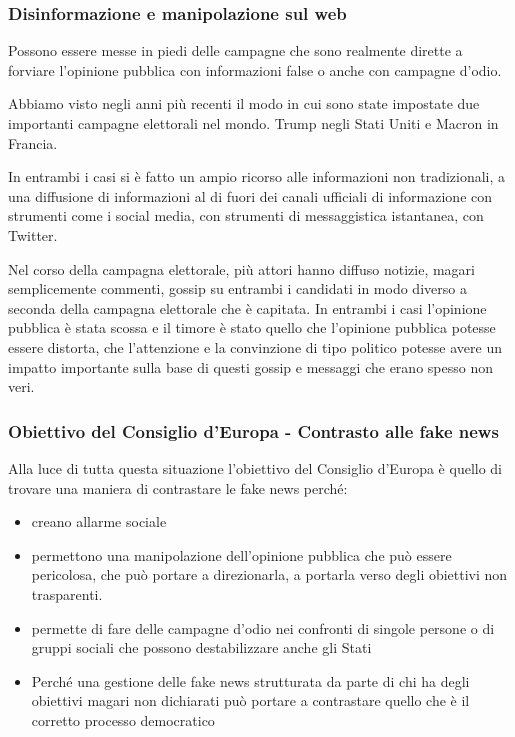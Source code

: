\subsubsection{Disinformazione e manipolazione sul web}
Possono essere messe in piedi delle campagne che sono realmente dirette a forviare l'opinione pubblica con informazioni false o anche con campagne d'odio. 

Abbiamo visto negli anni più recenti il modo in cui sono state impostate due importanti campagne elettorali nel mondo. Trump negli Stati Uniti e Macron in Francia.

In entrambi i casi si è fatto un ampio ricorso alle informazioni non tradizionali, a una diffusione di informazioni al di fuori dei canali ufficiali di informazione con strumenti come i social media, con strumenti di messaggistica istantanea, con Twitter. 

Nel corso della campagna elettorale, più attori hanno diffuso notizie, magari semplicemente commenti, gossip su entrambi i candidati in modo diverso a seconda della campagna elettorale che è capitata. In entrambi i casi l'opinione pubblica è stata scossa e il timore è stato quello che l'opinione pubblica potesse essere distorta, che l'attenzione e la convinzione di tipo politico potesse avere un impatto importante sulla base di questi gossip e messaggi che erano spesso non veri.

\subsubsection{Obiettivo del Consiglio d'Europa - Contrasto alle fake news}
Alla luce di tutta questa situazione l'obiettivo del Consiglio d'Europa è quello di trovare una maniera di contrastare le fake news perché:
\begin{itemize}
    \item creano allarme sociale
    \item permettono una manipolazione dell'opinione pubblica che può essere pericolosa, che può portare a direzionarla, a portarla verso degli obiettivi non trasparenti.
    \item permette di fare delle campagne d'odio nei confronti di singole persone o di gruppi sociali che possono destabilizzare anche gli Stati
    \item Perché una gestione delle fake news strutturata da parte di chi ha degli obiettivi magari non dichiarati può portare a contrastare quello che è il corretto processo democratico
\end{itemize}

